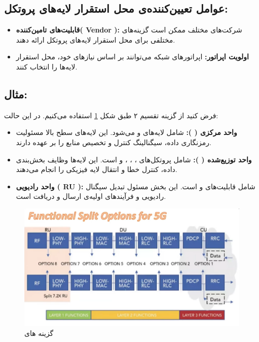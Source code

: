 \documentclass[landscape, 12pt]{report}
\begin{document}
 \subsection*{عوامل تعیین‌کننده‌ی محل استقرار لایه‌های پروتکل:}
 \begin{itemize}
\item 
\textbf{قابلیت‌های تامین‌کننده(
Vendor
):} شرکت‌های مختلف ممکن است گزینه‌های مختلفی برای محل استقرار لایه‌های پروتکل ارائه دهند.
\item 
\textbf{اولویت اپراتور:} اپراتورهای شبکه می‌توانند بر اساس نیازهای خود، محل استقرار لایه‌ها را انتخاب کنند.
 \end{itemize}
 
\subsection*{مثال:
	 }
فرض کنید از گزینه تقسیم ۲ طبق شکل \ref{fig:Functional_Split_Options_for_5G} استفاده می‌کنیم. در این حالت:
\begin{itemize}
	\item 
	\textbf{واحد مرکزی (
	): }
	شامل لایه‌های
	   و
	      می‌شود. این لایه‌های سطح بالا مسئولیت رمزنگاری داده، سیگنالینگ کنترل و تخصیص منابع را بر عهده دارند.
	\item 
\textbf{واحد توزیع‌شده (
	):}
	 شامل پروتکل‌های
	   ،
	    ،
	     ،
	      و    
	 است. این لایه‌ها وظایف بخش‌بندی داده، کنترل خطا و انتقال لایه فیزیکی را انجام می‌دهند.
	
	\item 
	\textbf{واحد رادیویی (
	RU
	):}
	 شامل قابلیت‌های
	   و
	      است. این بخش مسئول تبدیل سیگنال رادیویی و فرآیندهای اولیه‌ی ارسال و دریافت است.
\end{itemize}

\begin{figure}[ht]
	\centering
	\includegraphics[width=.6\linewidth]{Pic/Functional_Split_Options_for_5G}
	\caption{گزینه های
	}
	\label{fig:Functional_Split_Options_for_5G}
\end{figure}
\end{document}
